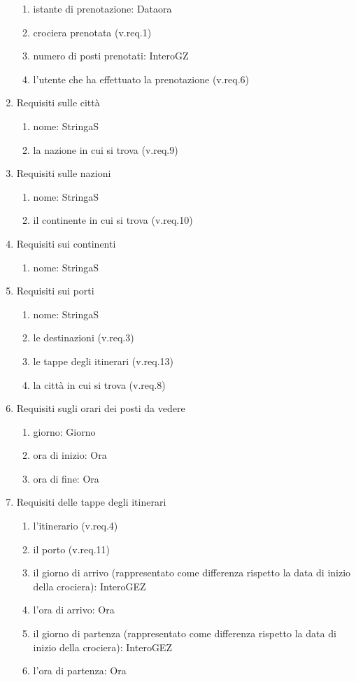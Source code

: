 \documentclass{article}
\begin{document}
\begin{enumerate}
    \begin{enumerate}
        \item istante di prenotazione: Dataora
        \item crociera prenotata (v.req.1)
        \item numero di posti prenotati: InteroGZ
        \item l'utente che ha effettuato la prenotazione (v.req.6)
    \end{enumerate}
    \item Requisiti sulle città
    \begin{enumerate}
        \item nome: StringaS
        \item la nazione in cui si trova (v.req.9)
    \end{enumerate}
    \item Requisiti sulle nazioni
    \begin{enumerate}
        \item nome: StringaS
        \item il continente in cui si trova (v.req.10)
    \end{enumerate}
    \item Requisiti sui continenti
    \begin{enumerate}
        \item nome: StringaS
    \end{enumerate}
    \item Requisiti sui porti
    \begin{enumerate}
        \item nome: StringaS
        \item le destinazioni (v.req.3)
        \item le tappe degli itinerari (v.req.13)
        \item la città in cui si trova (v.req.8)
    \end{enumerate}
    \item Requisiti sugli orari dei posti da vedere
    \begin{enumerate}
        \item giorno: Giorno
        \item ora di inizio: Ora
        \item ora di fine: Ora
    \end{enumerate}
    \item Requisiti delle tappe degli itinerari
    \begin{enumerate}
        \item l'itinerario (v.req.4)
        \item il porto (v.req.11)
        \item il giorno di arrivo (rappresentato come differenza rispetto la data di inizio della crociera): InteroGEZ
        \item l'ora di arrivo: Ora
        \item il giorno di partenza (rappresentato come differenza rispetto la data di inizio della crociera): InteroGEZ
        \item l'ora di partenza: Ora
    \end{enumerate}
\end{enumerate}
\end{document}
